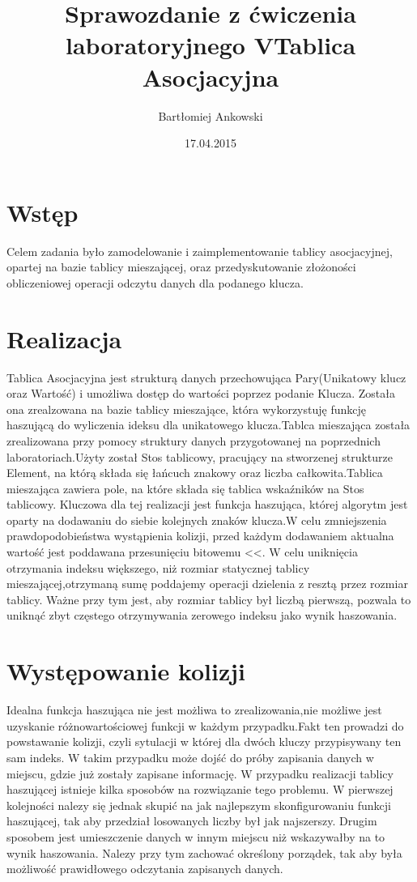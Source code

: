 \documentclass[12pt,a4paper,titlepage]{article}
\title{Sprawozdanie z ćwiczenia laboratoryjnego V\newline Tablica Asocjacyjna}
\date{17.04.2015}
\author{Bartłomiej Ankowski}
\begin{document}
\maketitle
\pagestyle{empty}
\tableofcontents
\section{Wstęp}
Celem zadania było zamodelowanie i zaimplementowanie tablicy asocjacyjnej, opartej na bazie tablicy
mieszającej, oraz przedyskutowanie złożoności obliczeniowej operacji odczytu danych dla podanego klucza.
\section{Realizacja}
Tablica Asocjacyjna jest strukturą danych przechowująca Pary(Unikatowy klucz oraz Wartość) i umożliwa dostęp do wartości poprzez podanie Klucza.
Została ona zrealzowana na bazie tablicy mieszające, która wykorzystuję funkcję haszującą do wyliczenia
ideksu dla unikatowego klucza.Tablca mieszająca została zrealizowana przy pomocy struktury danych przygotowanej na poprzednich laboratoriach.Użyty został Stos tablicowy, pracujący na stworzenej strukturze Element, na którą składa się łańcuch znakowy oraz liczba całkowita.Tablica mieszająca zawiera pole, na które składa się tablica wskaźników na Stos tablicowy.
Kluczowa dla tej realizacji jest funkcja haszująca, której algorytm jest oparty na dodawaniu do siebie kolejnych znaków klucza.W celu zmniejszenia prawdopodobieństwa wystąpienia kolizji, przed każdym dodawaniem
aktualna wartość jest poddawana przesunięciu bitowemu <<.
W celu uniknięcia otrzymania indeksu większego, niż rozmiar statycznej tablicy mieszającej,otrzymaną sumę 
poddajemy operacji dzielenia z resztą przez rozmiar tablicy. Ważne przy tym jest, aby rozmiar tablicy był liczbą pierwszą, pozwala to uniknąć zbyt częstego otrzymywania zerowego indeksu jako wynik haszowania.
\section{Występowanie kolizji}
Idealna funkcja haszująca nie jest możliwa to zrealizowania,nie możliwe jest uzyskanie różnowartościowej funkcji w każdym przypadku.Fakt ten prowadzi do powstawanie kolizji, czyli sytulacji w której dla dwóch kluczy przypisywany ten sam indeks.
W takim przypadku może dojść do próby zapisania danych w miejscu, gdzie już zostały zapisane informację.
W przypadku realizacji tablicy haszującej istnieje kilka sposobów na rozwiązanie tego problemu.
W pierwszej kolejności nalezy się jednak skupić na jak najlepszym skonfigurowaniu funkcji haszującej, tak aby przedział losowanych liczby był jak najszerszy. Drugim sposobem jest umieszczenie danych w innym miejscu niż wskazywałby na to wynik haszowania.
Nalezy przy tym zachować określony porządek, tak aby była możliwość prawidłowego odczytania zapisanych danych.
\end{document}
